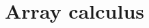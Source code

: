 \documentclass[preprint,acmsmall]{acmart}
\begin{document}
\title{Array calculus}


\maketitle





% 
\clearpage
\end{document}
